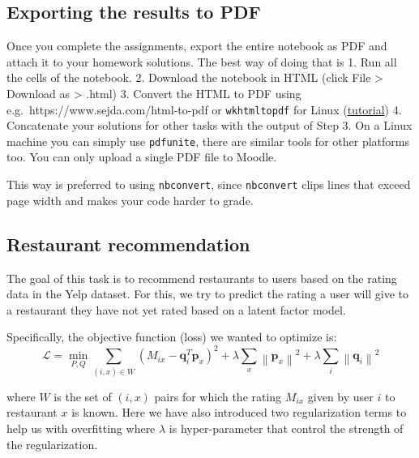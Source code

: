 \documentclass{article}
\begin{document}
        \hypertarget{exporting-the-results-to-pdf}{%
    \subsection{Exporting the results to
    PDF}\label{exporting-the-results-to-pdf}}
    
    Once you complete the assignments, export the entire notebook as PDF and
    attach it to your homework solutions. The best way of doing that is 1.
    Run all the cells of the notebook. 2. Download the notebook in HTML
    (click File \textgreater{} Download as \textgreater{} .html) 3. Convert
    the HTML to PDF using e.g.~https://www.sejda.com/html-to-pdf or
    \texttt{wkhtmltopdf} for Linux
    (\href{https://www.cyberciti.biz/open-source/html-to-pdf-freeware-linux-osx-windows-software/}{tutorial})
    4. Concatenate your solutions for other tasks with the output of Step 3.
    On a Linux machine you can simply use \texttt{pdfunite}, there are
    similar tools for other platforms too. You can only upload a single PDF
    file to Moodle.
    
    This way is preferred to using \texttt{nbconvert}, since
    \texttt{nbconvert} clips lines that exceed page width and makes your
    code harder to grade.
    
        \hypertarget{restaurant-recommendation}{%
    \subsection{Restaurant recommendation}\label{restaurant-recommendation}}
    
    The goal of this task is to recommend restaurants to users based on the
    rating data in the Yelp dataset. For this, we try to predict the rating
    a user will give to a restaurant they have not yet rated based on a
    latent factor model.
    
    Specifically, the objective function (loss) we wanted to optimize is: \[
    \mathcal{L} = \min_{P, Q} \sum_{(i, x) \in W} (M_{ix} - \mathbf{q}_i^T\mathbf{p}_x)^2 + \lambda\sum_x{\left\lVert \mathbf{p}_x  \right\rVert}^2 + \lambda\sum_i {\left\lVert\mathbf{q}_i  \right\rVert}^2
    \]
    
    where \(W\) is the set of \((i, x)\) pairs for which the rating
    \(M_{ix}\) given by user \(i\) to restaurant \(x\) is known. Here we
    have also introduced two regularization terms to help us with
    overfitting where \(\lambda\) is hyper-parameter that control the
    strength of the regularization.
    
\end{document}
